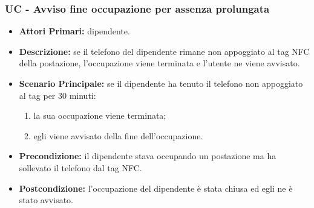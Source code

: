 \subsubsection{ UC - Avviso fine occupazione per assenza prolungata}
\begin{itemize}
	\item\textbf{Attori Primari:} dipendente.
	\item\textbf{Descrizione:} se il telefono del dipendente rimane non appoggiato al tag NFC della postazione, l'occupazione viene terminata e l'utente ne viene avvisato.
	\item\textbf{Scenario Principale:} se il dipendente ha tenuto il telefono non appoggiato al tag per 30 minuti:
	\begin{enumerate}
		\item la sua occupazione viene terminata;
		\item egli viene avvisato della fine dell'occupazione.
	\end{enumerate}
	\item\textbf{Precondizione:} il dipendente stava occupando un postazione ma ha sollevato il telefono dal tag NFC.
	\item\textbf{Postcondizione:} l'occupazione del dipendente è stata chiusa ed egli ne è stato avvisato.
\end{itemize}

